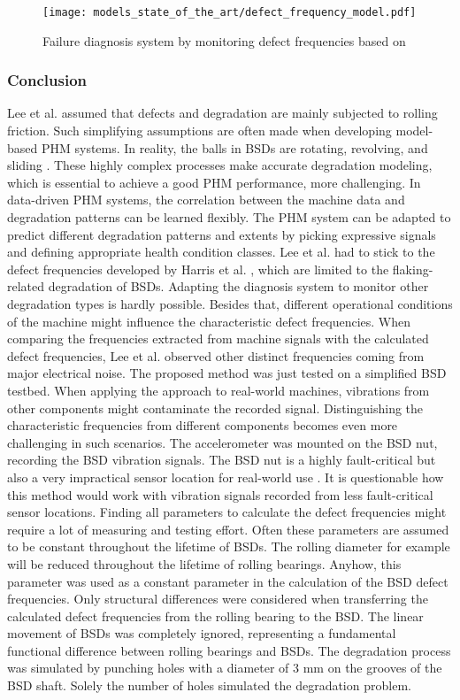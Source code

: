 \begin{figure}[H]
  \centering
  \texttt{[image: models\_state\_of\_the\_art/defect\_frequency\_model.pdf]}
  \caption{Failure diagnosis system by monitoring defect frequencies based on \cite{Lee2015}}
  \label{fig:defect_frequency_model}
\end{figure}

\subsubsection{Conclusion}
Lee et al. \cite{Lee2015} assumed that defects and degradation are mainly subjected to rolling friction. Such simplifying assumptions are often made when developing model-based PHM systems. In reality, the balls in BSDs are rotating, revolving, and sliding \cite{Lee2015}. These highly complex processes make accurate degradation modeling, which is essential to achieve a good PHM performance, more challenging. In data-driven PHM systems, the correlation between the machine data and degradation patterns can be learned flexibly. The PHM system can be adapted to predict different degradation patterns and extents by picking expressive signals and defining appropriate health condition classes. Lee et al. \cite{Lee2015} had to stick to the defect frequencies developed by Harris et al. \cite{Harris1996}, which are limited to the flaking-related degradation of BSDs. Adapting the diagnosis system to monitor other degradation types is hardly possible. Besides that, different operational conditions of the machine might influence the characteristic defect frequencies. When comparing the frequencies extracted from machine signals with the calculated defect frequencies, Lee et al. observed other distinct frequencies coming from major electrical noise. The proposed method was just tested on a simplified BSD testbed. When applying the approach to real-world machines, vibrations from other components might contaminate the recorded signal. Distinguishing the characteristic frequencies from different components becomes even more challenging in such scenarios. The accelerometer was mounted on the BSD nut, recording the BSD vibration signals. The BSD nut is a highly fault-critical but also a very impractical sensor location for real-world use \cite{Pandhare2021}. It is questionable how this method would work with vibration signals recorded from less fault-critical sensor locations. Finding all parameters to calculate the defect frequencies might require a lot of measuring and testing effort. Often these parameters are assumed to be constant throughout the lifetime of BSDs. The rolling diameter for example will be reduced throughout the lifetime of rolling bearings. Anyhow, this parameter was used as a constant parameter in the calculation of the BSD defect frequencies. Only structural differences were considered when transferring the calculated defect frequencies from the rolling bearing to the BSD. The linear movement of BSDs was completely ignored, representing a fundamental functional difference between rolling bearings and BSDs. The degradation process was simulated by punching holes with a diameter of 3 mm on the grooves of the BSD shaft. Solely the number of holes simulated the degradation problem. 